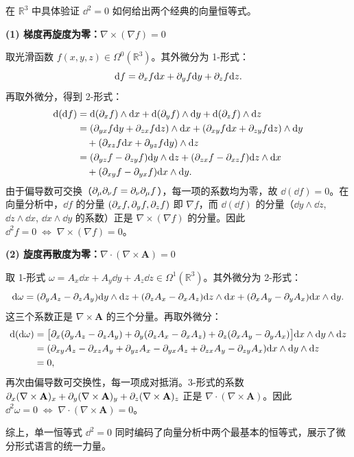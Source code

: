 \begin{example}[$\dd^2 = 0$ 推出向量恒等式]
在 $\mathbb{R}^3$ 中具体验证 $\dd^2 = 0$ 如何给出两个经典的向量恒等式。

\textbf{(1) 梯度再旋度为零：}$\nabla \times (\nabla f) = 0$

取光滑函数 $f(x,y,z) \in \Omega^0(\mathbb{R}^3)$。其外微分为 1-形式：
\begin{equation}
    \dd f = \partial_x f \dd x + \partial_y f \dd y + \partial_z f \dd z.
\end{equation}
再取外微分，得到 2-形式：
\begin{align}
    \dd(\dd f) &= \dd(\partial_x f) \wedge \dd x + \dd(\partial_y f) \wedge \dd y + \dd(\partial_z f) \wedge \dd z \nonumber\\
    &= (\partial_{yx} f \dd y + \partial_{zx} f \dd z) \wedge \dd x
     + (\partial_{xy} f \dd x + \partial_{zy} f \dd z) \wedge \dd y \nonumber\\
    &\quad + (\partial_{xz} f \dd x + \partial_{yz} f \dd y) \wedge \dd z \nonumber\\
    &= (\partial_{yz} f - \partial_{zy} f) \dd y \wedge \dd z
     + (\partial_{zx} f - \partial_{xz} f) \dd z \wedge \dd x \nonumber\\
    &\quad + (\partial_{xy} f - \partial_{yx} f) \dd x \wedge \dd y.
\end{align}
由于偏导数可交换（$\partial_\mu \partial_\nu f = \partial_\nu \partial_\mu f$），每一项的系数均为零，故 $\dd(\dd f) = 0$。在向量分析中，$\dd f$ 的分量 $(\partial_x f, \partial_y f, \partial_z f)$ 即 $\nabla f$，而 $\dd(\dd f)$ 的分量（$\dd y \wedge \dd z$, $\dd z \wedge \dd x$, $\dd x \wedge \dd y$ 的系数）正是 $\nabla \times (\nabla f)$ 的分量。因此 $\dd^2 f = 0 \;\Longleftrightarrow\; \nabla \times (\nabla f) = 0$。

\textbf{(2) 旋度再散度为零：}$\nabla \cdot (\nabla \times \mathbf{A}) = 0$

取 1-形式 $\omega = A_x \dd x + A_y \dd y + A_z \dd z \in \Omega^1(\mathbb{R}^3)$。其外微分为 2-形式：
\begin{equation}
    \dd\omega = (\partial_y A_z - \partial_z A_y) \dd y \wedge \dd z
              + (\partial_z A_x - \partial_x A_z) \dd z \wedge \dd x
              + (\partial_x A_y - \partial_y A_x) \dd x \wedge \dd y.
\end{equation}
这三个系数正是 $\nabla \times \mathbf{A}$ 的三个分量。再取外微分：
\begin{align}
    \dd(\dd\omega) &= \bigl[\partial_x(\partial_y A_z - \partial_z A_y) + \partial_y(\partial_z A_x - \partial_x A_z) + \partial_z(\partial_x A_y - \partial_y A_x)\bigr] \dd x \wedge \dd y \wedge \dd z \nonumber\\
    &= (\partial_{xy} A_z - \partial_{xz} A_y + \partial_{yz} A_x - \partial_{yx} A_z + \partial_{zx} A_y - \partial_{zy} A_x) \dd x \wedge \dd y \wedge \dd z \nonumber\\
    &= 0,
\end{align}
再次由偏导数可交换性，每一项成对抵消。3-形式的系数 $\partial_x(\nabla \times \mathbf{A})_x + \partial_y(\nabla \times \mathbf{A})_y + \partial_z(\nabla \times \mathbf{A})_z$ 正是 $\nabla \cdot (\nabla \times \mathbf{A})$。因此 $\dd^2 \omega = 0 \;\Longleftrightarrow\; \nabla \cdot (\nabla \times \mathbf{A}) = 0$。

综上，单一恒等式 $\dd^2 = 0$ 同时编码了向量分析中两个最基本的恒等式，展示了微分形式语言的统一力量。
\end{example}

